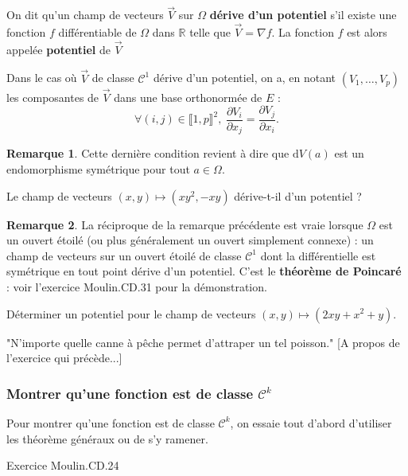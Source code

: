 \documentclass[french]{article}
\newcommand{\R}{\mathbb{R}}
\renewcommand{\d}{\text{d}}
\theoremstyle{plain}
\theoremstyle{definition}
\newtheorem*{rmq}{Remarque}
\theoremstyle{remark}
\begin{document}
On dit qu'un champ de vecteurs $\overrightarrow{V}$ sur $\Omega$ \textbf{dérive d'un potentiel} s'il existe une fonction $f$ différentiable de $\Omega$ dans $\R$ telle que $\overrightarrow{V}=\nabla f$. La fonction $f$ est alors appelée \textbf{potentiel} de $\overrightarrow{V}$

Dans le cas où $\overrightarrow{V}$ de classe $\mathcal{C}^1$ dérive d'un potentiel, on a, en notant $(V_1,\ldots,V_p)$ les composantes de $\overrightarrow{V}$ dans une base orthonormée de $E$ :
$$\forall (i,j)\in\llbracket1,p\rrbracket^2,\ \frac{\partial V_i}{\partial x_j}=\frac{\partial V_j}{\partial x_i}.$$

\begin{rmq}
	Cette dernière condition revient à dire que $\d V(a)$ est un endomorphisme symétrique pour tout $a\in\Omega$.
\end{rmq}

\begin{exo}
	Le champ de vecteurs $(x,y)\mapsto (xy^2,-xy)$ dérive-t-il d'un potentiel ?
\end{exo}

\begin{rmq}
	La réciproque de la remarque précédente est vraie lorsque $\Omega$ est un ouvert étoilé (ou plus généralement un ouvert simplement connexe) : un champ de vecteurs sur un ouvert étoilé de classe $\mathcal{C}^1$ dont la différentielle est symétrique en tout point dérive d'un potentiel. C'est le \textbf{théorème de Poincaré} : voir l'exercice Moulin.CD.31 pour la démonstration.
\end{rmq}

\begin{exo}
	Déterminer un potentiel pour le champ de vecteurs $(x,y)\mapsto (2xy+x^2+y)$.
\end{exo}

"N'importe quelle canne à pêche permet d'attraper un tel poisson." [A propos de l'exercice qui précède...]

\subsubsection*{Montrer qu'une fonction est de classe $\mathcal{C}^k$}

\begin{met}
	Pour montrer qu'une fonction est de classe $\mathcal{C}^k$, on essaie tout d'abord d'utiliser les théorème généraux ou de s'y ramener.
\end{met}

Exercice Moulin.CD.24
\end{document}
